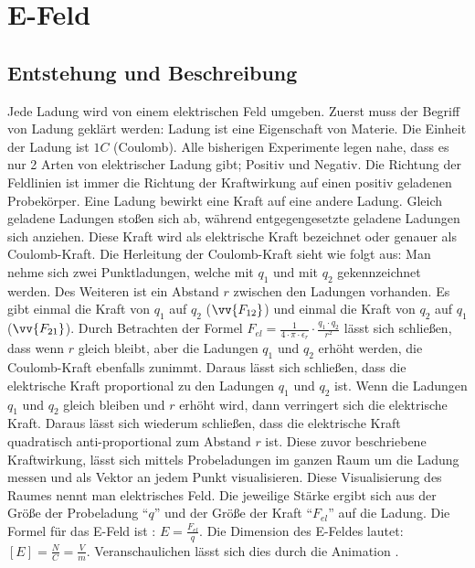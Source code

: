 \section{E-Feld}
\subsection{Entstehung und Beschreibung}
Jede Ladung wird von einem elektrischen Feld umgeben.
Zuerst muss der Begriff von Ladung geklärt werden:
Ladung ist eine Eigenschaft von Materie.
Die Einheit der Ladung ist $1C$ (Coulomb).
Alle bisherigen Experimente legen nahe, dass es nur 2 Arten von elektrischer Ladung gibt; Positiv und Negativ.
Die Richtung der Feldlinien ist immer die Richtung der Kraftwirkung auf einen positiv geladenen Probekörper.
Eine Ladung bewirkt eine Kraft auf eine andere Ladung.
Gleich geladene Ladungen stoßen sich ab, während entgegengesetzte geladene Ladungen sich anziehen.
Diese Kraft wird als elektrische Kraft bezeichnet oder genauer als Coulomb-Kraft.
Die Herleitung der Coulomb-Kraft sieht wie folgt aus:
Man nehme sich zwei Punktladungen, welche mit $q_1$ und mit $q_2$ gekennzeichnet werden. 
Des Weiteren ist ein Abstand $r$ zwischen den Ladungen vorhanden.
Es gibt einmal die Kraft von $q_1$ auf $q_2$ ($\vv{F_{12}}$) und einmal die Kraft von $q_2$ auf $q_1$ ($\vv{F_{21}}$).
Durch Betrachten der Formel $F_{el} = \frac{1}{4 \cdot \pi \cdot \epsilon_r} \cdot \frac{q_1 \cdot q_2}{r^2}$ 
lässt sich schließen, dass wenn $r$ gleich bleibt, aber die Ladungen $q_1$ und $q_2$ erhöht werden, die Coulomb-Kraft ebenfalls zunimmt.
Daraus lässt sich schließen, dass die elektrische Kraft proportional zu den Ladungen $q_1$ und $q_2$ ist. 
Wenn die Ladungen $q_1$ und $q_2$ gleich bleiben und $r$ erhöht wird, dann verringert sich die elektrische Kraft.
Daraus lässt sich wiederum schließen, dass die elektrische Kraft quadratisch anti-proportional zum Abstand $r$ ist.
Diese zuvor beschriebene Kraftwirkung, lässt sich mittels Probeladungen im ganzen Raum um die Ladung messen und als Vektor an jedem Punkt visualisieren.
Diese Visualisierung des Raumes nennt man elektrisches Feld.
Die jeweilige Stärke ergibt sich aus der Größe der Probeladung "`$q$"' und der Größe der Kraft "`$F_{el}$"' auf die Ladung.
Die Formel für das E-Feld ist : $E = \frac{F_{el}}{q}$.
Die Dimension des E-Feldes lautet: $[E] = \frac{N}{C} = \frac{V}{m}$.
Veranschaulichen lässt sich dies durch die Animation \cite{Animation}.

